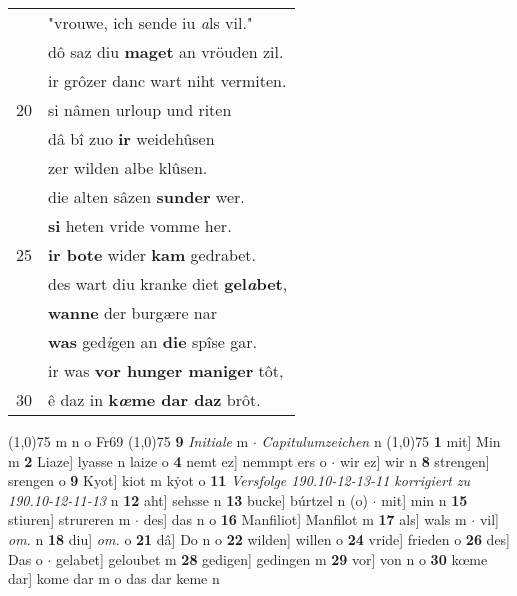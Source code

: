 \documentclass[8pt,a4paper,notitlepage]{article}
\begin{document}
\begin{table}[ht]
\begin{minipage}[t]{0.5\linewidth}
\begin{tabular}{rl}
 & "vrouwe, ich sende iu \textit{a}ls vil."\\ 
 & dô saz diu \textbf{maget} an vröuden zil.\\ 
 & ir grôzer danc wart niht vermiten.\\ 
20 & si nâmen urloup und riten\\ 
 & dâ bî zuo \textbf{ir} weidehûsen\\ 
 & zer wilden albe klûsen.\\ 
 & die alten sâzen \textbf{sunder} wer.\\ 
 & \textbf{si} heten vride vomme her.\\ 
25 & \textbf{ir bote} wider \textbf{kam} gedrabet.\\ 
 & des wart diu kranke diet \textbf{gel\textit{a}bet},\\ 
 & \textbf{wanne} der burgære nar\\ 
 & \textbf{was} ged\textit{i}gen an \textbf{die} spîse gar.\\ 
 & ir was \textbf{vor hunger maniger} tôt,\\ 
30 & ê daz in \textbf{k\textit{œ}me dar daz} brôt.\\ 
\end{tabular}
\scriptsize
\line(1,0){75} \newline
m n o Fr69 \newline
\line(1,0){75} \newline
\textbf{9} \textit{Initiale} m   $\cdot$ \textit{Capitulumzeichen} n  \newline
\line(1,0){75} \newline
\textbf{1} mit] Min m \textbf{2} Liaze] lyasse n laize o \textbf{4} nemt ez] nemmpt ers o  $\cdot$ wir ez] wir n \textbf{8} strengen] srengen o \textbf{9} Kyot] kiot m kẏot o \textbf{11} \textit{Versfolge 190.10-12-13-11 korrigiert zu 190.10-12-11-13} n  \textbf{12} aht] sehsse n \textbf{13} bucke] búrtzel n (o)  $\cdot$ mit] min n \textbf{15} stiuren] strureren m  $\cdot$ des] das n o \textbf{16} Manfiliot] Manfilot m \textbf{17} als] wals m  $\cdot$ vil] \textit{om.} n \textbf{18} diu] \textit{om.} o \textbf{21} dâ] Do n o \textbf{22} wilden] willen o \textbf{24} vride] frieden o \textbf{26} des] Das o  $\cdot$ gelabet] geloubet m \textbf{28} gedigen] gedingen m \textbf{29} vor] von n o \textbf{30} kœme dar] kome dar m o das dar keme n \newline
\end{minipage}
\end{table}
\newpage
\end{document}
